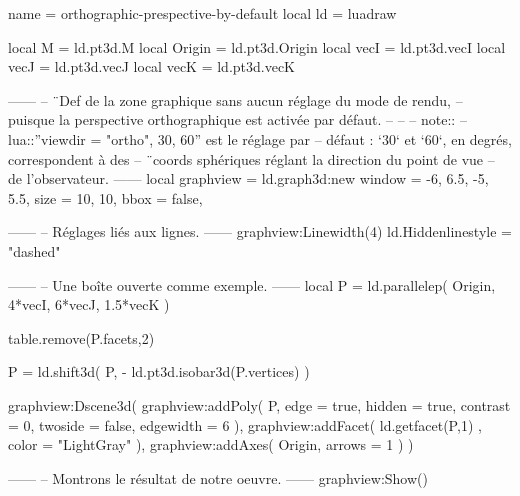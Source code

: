 \documentclass[border = 3pt]{standalone}
\begin{document}
\begin{luadraw*}{name = orthographic-prespective-by-default}
local ld = luadraw

local M      = ld.pt3d.M
local Origin = ld.pt3d.Origin
local vecI   = ld.pt3d.vecI
local vecJ   = ld.pt3d.vecJ
local vecK   = ld.pt3d.vecK

------
-- ¨Def de la zone graphique sans aucun réglage du mode de rendu,
-- puisque la perspective orthographique est activée par défaut.
--
--
-- note::
--     lua::''viewdir = {"ortho", 30, 60}'' est le réglage par
--     défaut : `30` et `60`, en degrés, correspondent à des
--     ¨coords sphériques réglant la direction du point de vue
--     de l'observateur.
------
local graphview = ld.graph3d:new{
  window = {-6, 6.5, -5, 5.5},
  size   = {10, 10},
  bbox   = false,
}

------
-- Réglages liés aux lignes.
------
graphview:Linewidth(4)
ld.Hiddenlinestyle = "dashed"

------
-- Une boîte ouverte comme exemple.
------
local P = ld.parallelep(
  Origin,
  4*vecI, 6*vecJ, 1.5*vecK
)

table.remove(P.facets,2)

P = ld.shift3d(
  P,
  - ld.pt3d.isobar3d(P.vertices)
)

graphview:Dscene3d(
  graphview:addPoly(
    P,
    {
      edge      = true,
      hidden    = true,
      contrast  = 0,
      twoside   = false,
      edgewidth = 6
    }
  ),
  graphview:addFacet(
    ld.getfacet(P,1) ,
    {color = "LightGray"}
  ),
  graphview:addAxes(
    Origin,
    {arrows = 1}
  )
)

------
-- Montrons le résultat de notre oeuvre.
------
graphview:Show()
\end{luadraw*}
\end{document}
